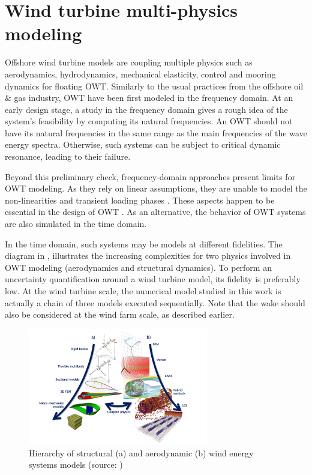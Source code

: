 \section{Wind turbine multi-physics modeling} \label{sec:owt_modeling}

Offshore wind turbine models are coupling multiple physics such as aerodynamics, hydrodynamics, mechanical elasticity, control and mooring dynamics for floating OWT. 
Similarly to the usual practices from the offshore oil \& gas industry, OWT have been first modeled in the frequency domain. 
At an early design stage, a study in the frequency domain gives a rough idea of the system's feasibility by computing its natural frequencies. 
An OWT should not have its natural frequencies in the same range as the main frequencies of the wave energy spectra. 
Otherwise, such systems can be subject to critical dynamic resonance, leading to their failure.

Beyond this preliminary check, frequency-domain approaches present limits for OWT modeling. 
As they rely on linear assumptions, they are unable to model the non-linearities and transient loading phases \citep{matha_2011_ISOPE}. 
These aspects happen to be essential in the design of OWT \citep{jonkman_2011_ISOPE}. 
As an alternative, the behavior of OWT systems are also simulated in the time domain. 

In the time domain, such systems may be models at different fidelities. 
The diagram in , illustrates the increasing complexities for two physics involved in OWT modeling (aerodynamics and structural dynamics). 
To perform an uncertainty quantification around a wind turbine model, its fidelity is preferably low. 
At the wind turbine scale, the numerical model studied in this work is actually a chain of three models executed sequentially. 
Note that the wake should also be considered at the wind farm scale, as described earlier. 

\begin{figure}
    \centering
    \includegraphics[width=0.7\textwidth]{./part1/figures/OWT_modeling_fidelities.png}
    \caption{Hierarchy of structural (a) and aerodynamic (b) wind energy systems models (source: \citet{veers_2019_review})}
    \label{fig:owt_modeling_fidelities}
\end{figure}


